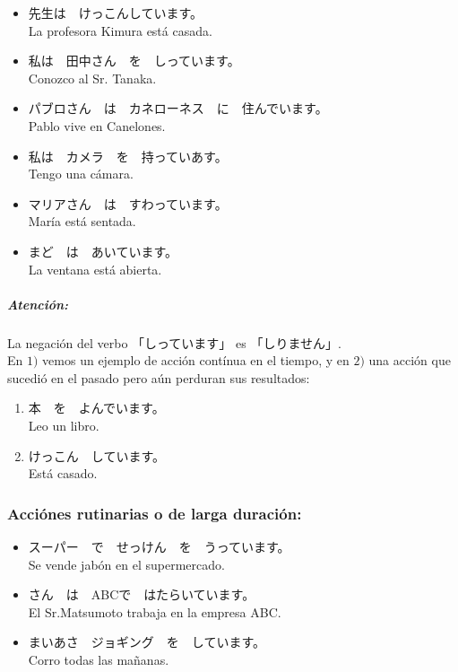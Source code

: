\documentclass[a4paper,12pt,oneside]{report}
\def\bv{\textbf{V}} %
\begin{document}
\begin{CJK*}{UTF8}{min}
        \fbox{\bv(て) います}

        \begin{itemize}
          \item {}先生は　けっこんしています。\\
                La profesora Kimura est\'a casada.
          \item 私は　田中さん　を　しっています。\\
                Conozco al Sr. Tanaka.
          \item パブロさん　は　カネローネス　に　住んでいます。\\
                Pablo vive en Canelones.
          \item 私は　カメラ　を　持っていあす。\\
                Tengo una c\'amara.
          \item マリアさん　は　すわっています。\\
                Mar\'ia est\'a sentada.
          \item まど　は　あいています。\\
                La ventana est\'a abierta.
        \end{itemize}

        \subparagraph{Atenci\'on:}
          La negaci\'on del verbo 「しっています」 es 「しりません」.\\

        En $1)$ vemos un ejemplo de acci\'on cont\'inua en el tiempo, y en $2)$ una acci\'on que sucedi\'o en el pasado pero a\'un perduran sus resultados:

        \begin{enumerate}
          \item 本　を　よんでいます。\\
                Leo un libro.
          \item けっこん　しています。\\
                Est\'a casado.
        \end{enumerate}

      \subsubsection{Acci\'ones rutinarias o de larga duraci\'on:}
        \fbox{\bv(て) います}

        \begin{itemize}
          \item スーパー　で　せっけん　を　うっています。\\
                Se vende jab\'on en el supermercado.
          \item {}さん　は　ABCで　はたらいています。\\
                El Sr.Matsumoto trabaja en la empresa ABC.
          \item まいあさ　ジョギング　を　しています。\\
                Corro todas las mañanas.
        \end{itemize}
        \hfill


\end{CJK*}
\end{document}
